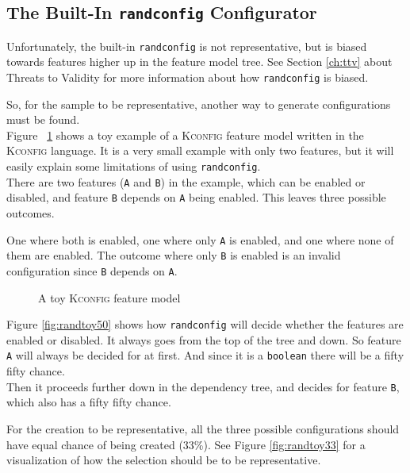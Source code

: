 \documentclass[a4paper,11pt]{report}
\newcommand{\figa}{
    \begin{figure}[!htpb]
    \centering
}
\newcommand{\figb}[2]{
    \caption{#1}
    \label{#2}
    \end{figure}
}
\begin{document}
            \subsection{The Built-In \texttt{randconfig} Configurator}
Unfortunately, the built-in \texttt{randconfig} is not representative, but is 
biased towards features higher up in the feature model tree. See Section 
\ref{ch:ttv} about Threats to Validity for more information about how 
\texttt{randconfig} is biased.

So, for the sample to be representative, another way to generate configurations 
must be found.
\\

Figure ~\ref{randconfigtoy} shows a toy example of a \textsc{Kconfig} feature 
model written in the \textsc{Kconfig} language.  It is a very small example 
with only two features, but it will easily explain some limitations of using 
\texttt{randconfig}.
\\

There are two features (\texttt{A} and \texttt{B}) in the example, which can be 
enabled or disabled, and feature \texttt{B} depends on \texttt{A} being enabled.
This leaves three possible outcomes. 

One where both is enabled, one where only \texttt{A} is enabled, and one where 
none of them are enabled. The outcome where only \texttt{B} is enabled is an 
invalid configuration since \texttt{B} depends on \texttt{A}.

\figa
    
\figb{A toy \textsc{Kconfig} feature model}{randconfigtoy}

Figure \ref{fig:randtoy50} shows how \texttt{randconfig} will decide whether 
the features are enabled or disabled. It always goes from the top of the tree 
and down. So feature \texttt{A} will always be decided for at first. And since 
it is a \texttt{boolean} there will be a fifty fifty chance.
\\

Then it proceeds further down in the dependency tree, and decides for feature
\texttt{B}, which also has a fifty fifty chance.

For the creation to be representative, all the three possible configurations 
should have equal chance of being created (33\%). See Figure 
\ref{fig:randtoy33} for a visualization of how the selection should 
be to be representative.
\end{document}
